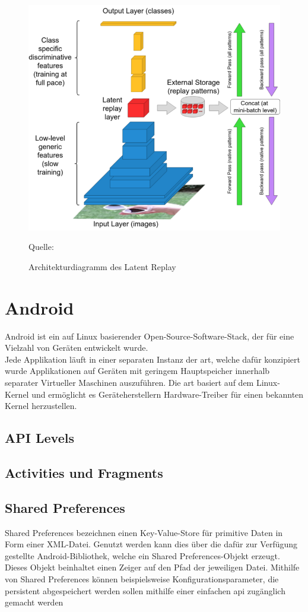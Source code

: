 \documentclass[oneside]{ausarbeitung}
\begin{document}
\begin{figure}[hptb]
  \centering
  \includegraphics[height=0.4\textheight]{images/latent-replay.png}
  \caption{Architekturdiagramm des Latent Replay} Quelle: \cite{Pellegrini2019}
  \label{fig:latent-replay}
\end{figure}
\section{Android}
Android ist ein auf Linux basierender Open-Source-Software-Stack, der für eine Vielzahl von Geräten entwickelt wurde.\\
Jede Applikation läuft in einer separaten Instanz der \ac{art}, welche dafür konzipiert wurde Applikationen auf Geräten mit geringem Hauptspeicher innerhalb separater Virtueller Maschinen auszuführen. Die \ac{art} basiert auf dem Linux-Kernel und ermöglicht es Geräteherstellern Hardware-Treiber für einen bekannten Kernel herzustellen.
\cite{android-platform}
\subsection{API Levels}
\subsection{Activities und Fragments}
\subsection{Shared Preferences}
Shared Preferences bezeichnen einen Key-Value-Store für primitive Daten in Form einer XML-Datei. Genutzt werden kann dies über die dafür zur Verfügung gestellte Android-Bibliothek, welche ein Shared Preferences-Objekt erzeugt. Dieses Objekt beinhaltet einen Zeiger auf den Pfad der jeweiligen Datei. Mithilfe von Shared Preferences können beispielsweise Konfigurationsparameter, die persistent abgespeichert werden sollen mithilfe einer einfachen \ac{api} zugänglich gemacht werden
\end{document}
